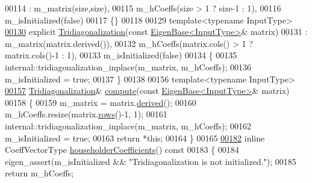 \begin{DoxyCode}
00114       : m\_matrix(size,size),
00115         m\_hCoeffs(size > 1 ? size-1 : 1),
00116         m\_isInitialized(false)
00117     \{\}
00118 
00129     \textcolor{keyword}{template}<\textcolor{keyword}{typename} InputType>
\hyperlink{group___eigenvalues___module_a05406b7df9a92fdcba72d31443f67a98}{00130}     \textcolor{keyword}{explicit} \hyperlink{group___eigenvalues___module_a05406b7df9a92fdcba72d31443f67a98}{Tridiagonalization}(\textcolor{keyword}{const} \hyperlink{group___core___module_struct_eigen_1_1_eigen_base}{EigenBase<InputType>}& matrix)
00131       : m\_matrix(matrix.derived()),
00132         m\_hCoeffs(matrix.cols() > 1 ? matrix.cols()-1 : 1),
00133         m\_isInitialized(false)
00134     \{
00135       internal::tridiagonalization\_inplace(m\_matrix, m\_hCoeffs);
00136       m\_isInitialized = \textcolor{keyword}{true};
00137     \}
00138 
00156     \textcolor{keyword}{template}<\textcolor{keyword}{typename} InputType>
\hyperlink{group___eigenvalues___module_acd288abb081d3b40b87e4b98cd8f6ee9}{00157}     \hyperlink{group___eigenvalues___module_class_eigen_1_1_tridiagonalization}{Tridiagonalization}& \hyperlink{group___eigenvalues___module_acd288abb081d3b40b87e4b98cd8f6ee9}{compute}(\textcolor{keyword}{const} 
      \hyperlink{group___core___module_struct_eigen_1_1_eigen_base}{EigenBase<InputType>}& matrix)
00158     \{
00159       m\_matrix = matrix.\hyperlink{group___core___module_a324b16961a11d2ecfd2d1b7dd7946545}{derived}();
00160       m\_hCoeffs.resize(matrix.\hyperlink{group___core___module_a8141320ba8df384426c298b32b000d8e}{rows}()-1, 1);
00161       internal::tridiagonalization\_inplace(m\_matrix, m\_hCoeffs);
00162       m\_isInitialized = \textcolor{keyword}{true};
00163       \textcolor{keywordflow}{return} *\textcolor{keyword}{this};
00164     \}
00165 
\hyperlink{group___eigenvalues___module_ac95b4e43dcf6c3c5074b8bea4fc67887}{00182}     \textcolor{keyword}{inline} CoeffVectorType \hyperlink{group___eigenvalues___module_ac95b4e43dcf6c3c5074b8bea4fc67887}{householderCoefficients}()\textcolor{keyword}{ const}
00183 \textcolor{keyword}{    }\{
00184       eigen\_assert(m\_isInitialized && \textcolor{stringliteral}{"Tridiagonalization is not initialized."});
00185       \textcolor{keywordflow}{return} m\_hCoeffs;

\end{DoxyCode}
